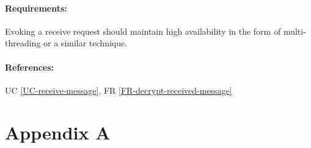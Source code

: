 \documentclass[11pt]{article}
\begin{document}
\paragraph{Requirements:} Evoking a receive request should maintain high availability in the form of multi-threading or a similar technique.
\paragraph{References:} UC \ref{UC-receive-message}, FR \ref{FR-decrypt-received-message}



\newpage
\section{Appendix A} \label{appendix-a}
\listoffigures
\end{document}
